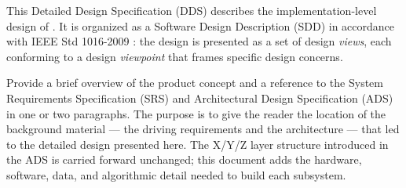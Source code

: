 This Detailed Design Specification (DDS) describes the implementation-level design of \productname. It is organized as a Software Design Description (SDD) in accordance with IEEE Std 1016-2009 \cite{IEEE1016}: the design is presented as a set of design \textit{views}, each conforming to a design \textit{viewpoint} that frames specific design concerns.

Provide a brief overview of the product concept and a reference to the System Requirements Specification (SRS) and Architectural Design Specification (ADS) in one or two paragraphs. The purpose is to give the reader the location of the background material --- the driving requirements and the architecture --- that led to the detailed design presented here. The X/Y/Z layer structure introduced in the ADS is carried forward unchanged; this document adds the hardware, software, data, and algorithmic detail needed to build each subsystem.
